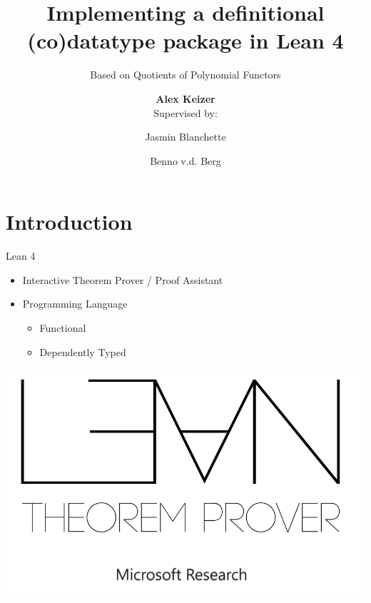 \documentclass[t,12pt]{beamer}
\title[]{Implementing a definitional (co)datatype package in Lean 4}
\subtitle{Based on Quotients of Polynomial Functors}
\date{}
\author{\textbf{Alex Keizer} \\ Supervised by: \and Jasmin Blanchette \and Benno v.d. Berg}
\begin{document}
\nonstopmode{} %



\section*{Introduction}

 {
  \begin{frame}[plain]
      \maketitle
  \end{frame}
  \addtocounter{framenumber}{-1}%
 }

 {
  \begin{frame}{Lean 4}
      \begin{itemize}
          \item Interactive Theorem Prover / Proof Assistant
          \item Programming Language
                \begin{itemize}
                    \item Functional
                    \item Dependently Typed
                \end{itemize}          
      \end{itemize}

      \bigskip

    \begin{center}
      \includegraphics[scale=0.22]{lean.png}
    \end{center}

  \end{frame}
 }
\end{document}
